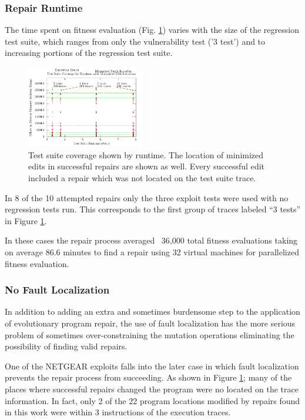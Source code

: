\documentclass{sigcomm-alternate}
\begin{document}
{\subsubsection{Repair Runtime}
\label{runtime}
The time spent on fitness evaluation (Fig. \ref{ts-cov-rt-w-min}) varies with the size of
the regression test suite, which ranges from only the vulnerability test ('3 test')
and to 
 increasing portions of the regression test
suite.

\begin{figure}[htb]
  \centering
  \includegraphics[width=0.46\textwidth]{ts-cov-and-runtime-w-min.pdf}  
  \caption{Test suite coverage shown by runtime.  The location of
    minimized edits in successful repairs are shown as well.  Every
    successful edit included a repair which was not located on the
    test suite trace.}
  \label{ts-cov-rt-w-min}
\end{figure}

In 8 of the 10 attempted repairs only the three exploit tests were
used with no regression tests run.  This corresponds to the first
group of traces labeled ``3 tests'' in Figure \ref{ts-cov-rt-w-min}.

In these cases the repair process averaged ~36,000 total fitness
evaluations taking on average 86.6 minutes to find a repair using 32
virtual machines for parallelized fitness evaluation.

\subsubsection{No Fault Localization}
\label{no-fault-localization}

In addition to adding an extra and sometimes burdensome step to the
application of evolutionary program repair, the use of fault
localization has the more serious problem of sometimes
over-constraining the mutation operations eliminating the possibility
of finding valid repairs.

One of the NETGEAR exploits falls into the later case in which fault
localization prevents the repair process from succeeding.  As shown in
Figure \ref{ts-cov-rt-w-min}; many of the places where successful
repairs changed the program were no located on the trace information.
In fact, only 2 of the 22 program locations modified by repairs found
in this work were within 3 instructions of the execution traces.

}
\end{document}
